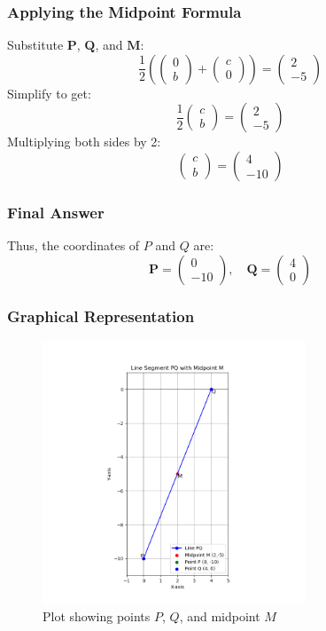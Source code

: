 \documentclass{beamer}
\begin{document}
\begin{frame}
\frametitle{Applying the Midpoint Formula}
Substitute \( \mathbf{P} \), \( \mathbf{Q} \), and \( \mathbf{M} \):
\[
\frac{1}{2} \left(\begin{pmatrix} 0 \\ b \end{pmatrix} + \begin{pmatrix} c \\ 0 \end{pmatrix}\right) = \begin{pmatrix} 2 \\ -5 \end{pmatrix}
\]
Simplify to get:
\[
\frac{1}{2} \begin{pmatrix} c \\ b \end{pmatrix} = \begin{pmatrix} 2 \\ -5 \end{pmatrix}
\]
Multiplying both sides by 2:
\[
\begin{pmatrix} c \\ b \end{pmatrix} = \begin{pmatrix} 4 \\ -10 \end{pmatrix}
\]
\end{frame}

\begin{frame}
\frametitle{Final Answer}
Thus, the coordinates of \( P \) and \( Q \) are:
\[
\mathbf{P} = \begin{pmatrix} 0 \\ -10 \end{pmatrix}, \quad \mathbf{Q} = \begin{pmatrix} 4 \\ 0 \end{pmatrix}
\]
\end{frame}

\begin{frame}
\frametitle{Graphical Representation}
\begin{figure}[h!]
\centering
\includegraphics[width=0.7\textwidth]{Figure_1.png}
\caption{Plot showing points \( P \), \( Q \), and midpoint \( M \)}
\label{fig:graph}
\end{figure}
\end{frame}
\end{document}
